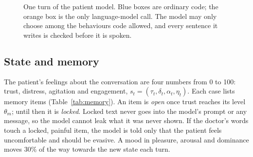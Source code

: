 \documentclass[sn-basic,Numbered]{sn-jnl}
\begin{document}
\begin{figure}[t]
\centering
{}
\caption{One turn of the patient model. Blue boxes are ordinary code; the orange box is the only language-model call. The model may only
choose among the behaviours code allowed, and every sentence it writes is checked before it is spoken.}
\label{fig:pipeline}
\end{figure}

\subsection{State and memory}
The patient's feelings about the conversation are four numbers from 0 to 100: trust, distress, agitation and engagement,
$s_t=(\tau_t,\delta_t,\alpha_t,\eta_t)$. Each case lists memory items (Table~\ref{tab:memory}). An item is \emph{open} once trust reaches its
level $\theta_m$; until then it is \emph{locked}. Locked text never goes into the model's prompt or any message, so the model cannot leak what
it was never shown. If the doctor's words touch a locked, painful item, the model is told only that the patient feels uncomfortable and should
be evasive. A mood in pleasure, arousal and dominance \cite{mehrabian1996pad} moves 30\% of the way towards the new state each turn.
\end{document}
